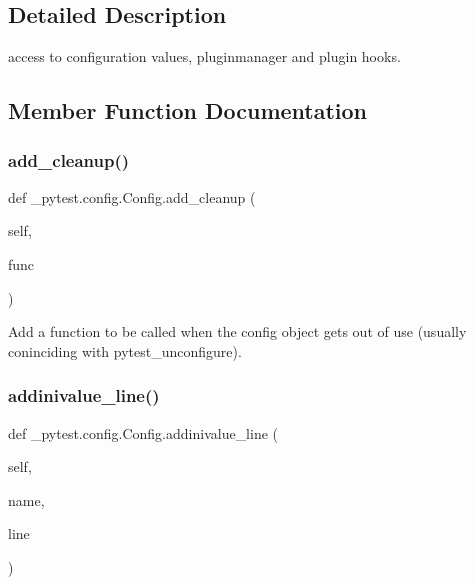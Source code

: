 \subsection{Detailed Description}
\begin{DoxyVerb}access to configuration values, pluginmanager and plugin hooks.  \end{DoxyVerb}
 

\subsection{Member Function Documentation}
\mbox{\label{class__pytest_1_1config_1_1_config_a38d8688170020acdbf7f63049d6dddde}} 
\subsubsection{\texorpdfstring{add\+\_\+cleanup()}{add\_cleanup()}}
{\footnotesize\ttfamily def \+\_\+pytest.\+config.\+Config.\+add\+\_\+cleanup (\begin{DoxyParamCaption}\item[{}]{self,  }\item[{}]{func }\end{DoxyParamCaption})}

\begin{DoxyVerb}Add a function to be called when the config object gets out of
use (usually coninciding with pytest_unconfigure).\end{DoxyVerb}
 \mbox{\label{class__pytest_1_1config_1_1_config_adcbe2df485fb1f99d289b25bd79f2715}} 
\subsubsection{\texorpdfstring{addinivalue\+\_\+line()}{addinivalue\_line()}}
{\footnotesize\ttfamily def \+\_\+pytest.\+config.\+Config.\+addinivalue\+\_\+line (\begin{DoxyParamCaption}\item[{}]{self,  }\item[{}]{name,  }\item[{}]{line }\end{DoxyParamCaption})}

